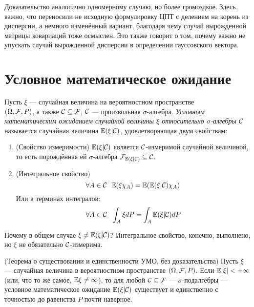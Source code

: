 \begin{note}
    Доказательство аналогично одномерному случаю, но более громоздкое. Здесь важно, что переносили не исходную формулировку ЦПТ с делением на корень из дисперсии, а немного изменённый вариант, благодаря чему случай вырожденной матрицы ковариаций тоже осмыслен. Это также говорит о том, почему важно не упускать случай вырожденной дисперсии в определении гауссовского вектора.
\end{note}

\section{Условное математическое ожидание}

\begin{definition}
    Пусть $\xi$ --- случайная величина на вероятностном пространстве \\ $(\Omega, \mathcal{F}, P)$, а также $\mathcal{C} \subseteq \mathcal{F}$, $\mathcal{C}$ --- произвольная $\sigma$-алгебра. \textit{Условным математическим ожиданием случайной величины $\xi$ относительно $\sigma$-алгебры $\mathcal{C}$} называется случайная величина $\mathbb{E}(\xi | \mathcal{C})$, удовлетворяющая двум свойствам:
    \begin{enumerate}
        \item (Свойство измеримости) $\mathbb{E}(\xi | \mathcal{C})$ является $\mathcal{C}$-измеримой случайной величиной, то есть порождённая ей $\sigma$-алгебра $\mathcal{F}_{\mathbb{E}(\xi | \mathcal{C})} \subseteq \mathcal{C}$.

        \item (Интегральное свойство)
        \[
            \forall A \in \mathcal{C} \ \ \mathbb{E}(\xi \chi_A) = \mathbb{E}(\mathbb{E}(\xi | \mathcal{C}) \chi_A)
        \]
        Или в терминах интегралов:
        \[
            \forall A \in \cC \ \ \int_A \xi dP = \int_A \E(\xi | \cC) dP
        \]
    \end{enumerate}
\end{definition}

\begin{note}
    Почему в общем случае $\xi \neq \mathbb{E}(\xi | \mathcal{C})$? Интегральное свойство, конечно, выполнено, но $\xi$ не обязательно $\mathcal{C}$-измерима.
\end{note}

\begin{theorem} (Теорема о существовании и единственности УМО, без доказательства)
    Пусть $\xi$ --- случайная величина в вероятностном пространстве $(\Omega, \mathcal{F}, P)$. Если $\mathbb{E}|\xi| < +\infty$ (или, что то же самое, $\mathbb{E}\xi \neq \infty$), то для любой $\mathcal{C} \subseteq \mathcal{F}$ --- $\sigma$-подалгебры --- условное математическое ожидание $\mathbb{E}(\xi | \mathcal{C})$ существует и единственно с точностью до равенства $P$-почти наверное.
\end{theorem}

